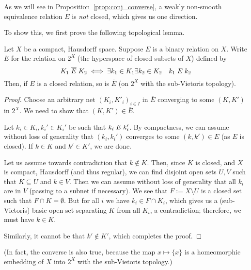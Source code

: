 	As we will see in Proposition~\ref{prop:conj_converse}, a weakly non-smooth equivalence relation $E$ is \emph{not} closed, which gives us one direction.
	
	To show this, we first prove the following topological lemma.
	
	\begin{lem}
		\label{lem:subv_closed_relation}
		Let $X$ be a compact, Hausdorff space. Suppose $E$ is a binary relation on $X$. Write $\overline E$ for the relation on $2^X$ (the hyperspace of closed subsets of $X$) defined by
		\[
		K_1 \mathrel{\overline E} K_2 \iff \exists k_1\in K_1\exists k_2\in K_2\quad k_1\mathrel{E} k_2
		\]
		Then, if $E$ is a closed relation, so is $\mathrel{\overline E}$ (on $2^X$ with the sub-Vietoris topology).
	\end{lem}
	\begin{proof}
		Choose an arbitrary net $(K_i,K'_i)_{i\in I}$ in $\mathrel{\overline E}$ converging to some $(K,K')$ in $2^X$. We need to show that $(K,K')\in \overline E$.
		
		Let $k_i\in K_i, k_i'\in K_i'$ be such that $k_i \mathrel{E} k_i'$. By compactness, we can assume without loss of generality that $(k_i,k_i')$ converges to some $(k,k') \in E$ (as $E$ is closed). If $k\in K$ and $k'\in K'$, we are done.
		
		Let us assume towards contradiction that $k\notin K$. Then, since $K$ is closed, and $X$ is compact, Hausdorff (and thus regular), we can find disjoint open sets $U,V$ such that $K\subseteq U$ and $k\in V$. Then we can assume without loss of generality that all $k_i$ are in $V$ (passing to a subnet if necessary). We see that $F:=X\setminus U$ is a closed set such that $F\cap K=\emptyset$. But for all $i$ we have $k_i\in F\cap K_i$, which gives us a (sub-Vietoris) basic open set separating $K$ from all $K_i$, a contradiction; therefore, we must have $k\in K$.
		
		Similarly, it cannot be that $k'\notin K'$, which completes the proof.
	\end{proof}
	(In fact, the converse is also true, because the map $x\mapsto \{x\}$ is a homeomorphic embedding of $X$ into $2^X$ with the sub-Vietoris topology.)
	
